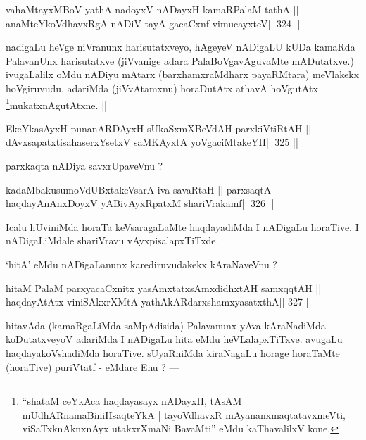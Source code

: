 \begin{shl}
vahaMtayxMBoV yathA nadoyxV nADayxH kamaRPalaM tathA ||
anaMteYkoVdhavxRgA nADiV tayA gacaCxnf vimucayxteV\hfill || 324 ||
\end{shl}

\begin{artha}
nadigaLu heVge niVranunx harisutatxveyo, hAgeyeV nADigaLU kUDa kamaRda 
PalavanUnx harisutatxve (jiVvanige adara PalaBoVgavAguvaMte 
mADutatxve.) ivugaLalilx oMdu nADiyu mAtarx (barxhamxraMdharx 
payaRMtara) meVlakekx hoVgiruvudu. adariMda (jiVvAtamxnu) horaDutAtx 
athavA hoVgutAtx \footnote[5]{``shataM ceYkAca haqdayasayx nADayxH, 
tAsAM mUdhARnamaBiniHsaqteYkA | tayoVdhavxR mAyananxmaqtatavxmeVti, 
viSaTxknAknxnAyx utakxrXmaNi BavaMti'' eMdu kaThavalilxV kone.}mukatxnAgutAtxne. ||
\end{artha}

\begin{shl}
EkeYkasAyxH punanARDAyxH sUkaSxmXBeVdAH parxkiVtiRtAH ||
dAvxsapatxtisahaserxYsetxV saMKAyxtA yoVgaciMtakeYH\hfill || 325 ||
\end{shl}


\begin{artha}
parxkaqta nADiya savxrUpaveVnu ?
\end{artha}

\begin{shl}
kadaMbakusumoVdUBxtakeVsarA iva savaRtaH ||
parxsaqtA haqdayAnAnxDoyxV yABivAyxRpatxM shariVrakamf\hfill || 326 ||
\end{shl}

\begin{artha}
Icalu hUviniMda horaTa keVsaragaLaMte haqdayadiMda I nADigaLu horaTive. I nADigaLiMdale shariVravu vAyxpisalapxTiTxde.
\end{artha}

\begin{artha}
`hitA' eMdu nADigaLanunx karediruvudakekx kAraNaveVnu ?
\end{artha}

\begin{shl}
hitaM PalaM parxyacaCxnitx yasAmxtatxsAmxdidhxtAH samxqqtAH ||
haqdayAtAtx viniSAkxrXMtA yathA\s kARdarxshamxyasatxthA\hfill || 327 ||
\end{shl}

\begin{artha}
hitavAda (kamaRgaLiMda saMpAdisida) Palavanunx yAva kAraNadiMda 
koDutatxveyoV adariMda I nADigaLu hita eMdu heVLalapxTiTxve. avugaLu 
haqdayakoVshadiMda horaTive. sUyaRniMda kiraNagaLu horage horaTaMte (horaTive) puriVtatf - eMdare Enu ? ---
\end{artha}


